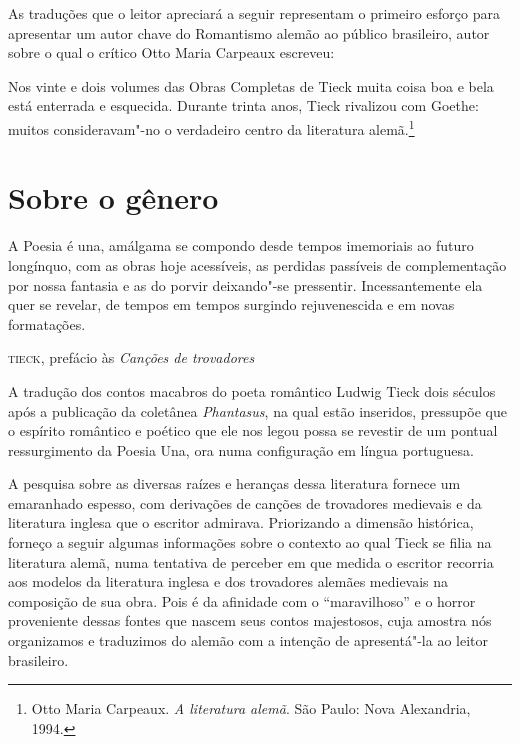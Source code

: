 As traduções que o leitor apreciará a seguir representam o primeiro esforço para 
apresentar um autor chave do Romantismo alemão ao público brasileiro, 
autor sobre o qual o crítico Otto Maria Carpeaux escreveu: 

\begin{hedraquote}
Nos vinte e dois volumes das Obras Completas de Tieck 
muita coisa boa e bela está enterrada e esquecida. Durante trinta anos, 
Tieck rivalizou com Goethe: muitos consideravam"-no o verdadeiro centro da
literatura alemã.\footnote{ Otto Maria Carpeaux. \textit{A literatura alemã}. 
São Paulo: Nova Alexandria, 1994.}
\end{hedraquote}

\section{Sobre o gênero}

\epigraph{A Poesia é una, amálgama se compondo desde tempos imemoriais
ao futuro longínquo, com as obras hoje acessíveis, as perdidas passíveis
de complementação por nossa fantasia e as do porvir deixando"-se pressentir. 
Incessantemente ela quer se revelar, de tempos em tempos surgindo rejuvenescida 
e em novas formatações.}{\textsc{tieck}, prefácio às \textit{Canções de trovadores}}

A tradução dos contos macabros do poeta romântico Ludwig Tieck dois
séculos após a publicação da coletânea \textit{Phantasus}, na qual estão
inseridos, pressupõe que o espírito romântico e poético que ele nos 
legou possa se revestir de um pontual ressurgimento da
Poesia Una, ora numa configuração em língua portuguesa. 

A pesquisa sobre as diversas raízes e heranças dessa literatura fornece
um emaranhado espesso, com derivações de canções de trovadores
medievais e da literatura inglesa que o escritor admirava. Priorizando
a dimensão histórica, forneço a seguir algumas informações sobre o
contexto ao qual Tieck se filia na literatura alemã, numa
tentativa de perceber em que medida o escritor recorria aos modelos da
literatura inglesa e dos trovadores alemães medievais na composição de
sua obra. Pois é da afinidade com o ``maravilhoso'' e o horror
proveniente dessas fontes que nascem seus contos majestosos, cuja
amostra nós organizamos e traduzimos do alemão com a intenção de
apresentá"-la ao leitor brasileiro. 

